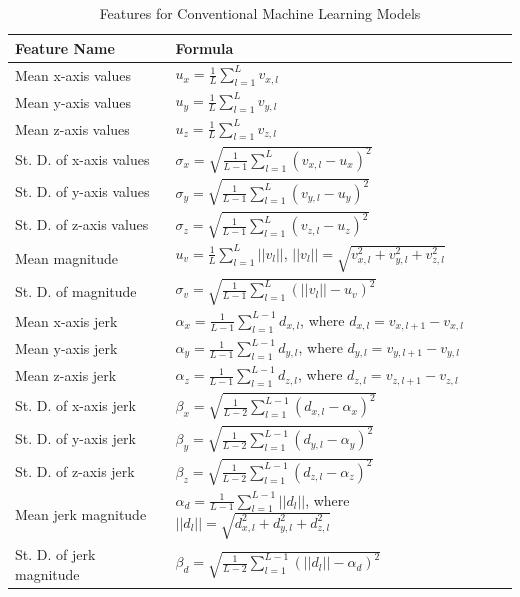 \begin{appendices}
\begin{table}[h]
\centering
\caption{Features for Conventional Machine Learning Models}
\label{tb:baseline_features}
\small
\begin{threeparttable}
\begin{tabular}{L{160pt}L{290pt}}
\toprule
    Feature Name & Formula \\ \midrule
    Mean x-axis values &  $u_{x} = \frac{1}{L} \sum_{l=1}^{L} v_{x,l}$ \\
    Mean y-axis values &  $u_{y} = \frac{1}{L} \sum_{l=1}^{L} v_{y,l}$ \\
    Mean z-axis values &  $u_{z} = \frac{1}{L} \sum_{l=1}^{L} v_{z,l}$ \\
    St. D. of x-axis values &  $\sigma_{x} = \sqrt{\frac{1}{L-1} \sum_{l=1}^{L} (v_{x,l} - u_{x} )^2 } $ \\
    St. D. of y-axis values &  $\sigma_{y} = \sqrt{\frac{1}{L-1} \sum_{l=1}^{L} (v_{y,l} - u_{y} )^2 } $ \\
    St. D. of z-axis values &  $\sigma_{z} = \sqrt{\frac{1}{L-1} \sum_{l=1}^{L} (v_{z,l} - u_{z} )^2 } $ \\
    Mean magnitude &  $u_{v} = \frac{1}{L} \sum_{l=1}^{L} ||v_l||$, $||v_l||=\sqrt{v_{x,l}^2+v_{y,l}^2+v_{z,l}^2} $ \\
    St. D. of magnitude &  $\sigma_{v} = \sqrt{\frac{1}{L-1} \sum_{l=1}^{L} (||v_l|| - u_v)^2 } $ \\
    Mean x-axis jerk & $\alpha_{x} = \frac{1}{L-1} \sum_{l=1}^{L-1} d_{x,l}$, where $d_{x,l}=v_{x,l+1}-v_{x,l}$ \\
    Mean y-axis jerk & $\alpha_{y} = \frac{1}{L-1} \sum_{l=1}^{L-1} d_{y,l}$, where $d_{y,l}=v_{y,l+1}-v_{y,l}$  \\
    Mean z-axis jerk & $\alpha_{z} = \frac{1}{L-1} \sum_{l=1}^{L-1} d_{z,l}$, where $d_{z,l}=v_{z,l+1}-v_{z,l}$  \\
    St. D. of x-axis jerk &  $\beta_{x} = \sqrt{\frac{1}{L-2} \sum_{l=1}^{L-1} (d_{x,l} - \alpha_{x} )^2 } $ \\
    St. D. of y-axis jerk &  $\beta_{y} = \sqrt{\frac{1}{L-2} \sum_{l=1}^{L-1} (d_{y,l} - \alpha_{y} )^2 } $ \\
    St. D. of z-axis jerk &  $\beta_{z} = \sqrt{\frac{1}{L-2} \sum_{l=1}^{L-1} (d_{z,l} - \alpha_{z} )^2 } $ \\
    Mean jerk magnitude &  $\alpha_{d} = \frac{1}{L-1} \sum_{l=1}^{L-1} ||d_l|| $, where $||d_l||=\sqrt{d_{x,l}^2+d_{y,l}^2+d_{z,l}^2}$ \\
    St. D. of jerk magnitude & $\beta_{d} = \sqrt{\frac{1}{L-2} \sum_{l=1}^{L-1} (||d_l|| - \alpha_{d})^2 } $  \\

\end{tabular}
\end{threeparttable}
\end{table}
\end{appendices}
